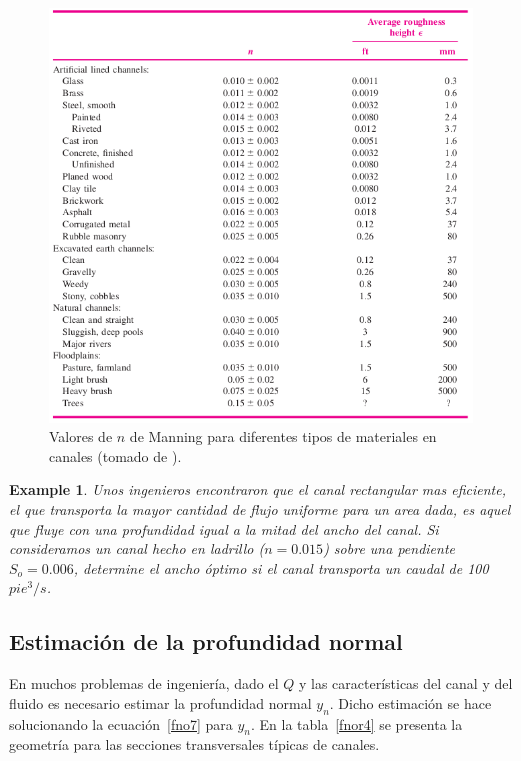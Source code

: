 \documentclass[11pt, oneside]{article}
\newtheorem{exa}{Example}
\begin{document}
\begin{figure}[h]
\centering
\includegraphics[width=\textwidth]{fnor3.png}
\caption{Valores de $n$ de Manning para diferentes tipos de materiales en canales (tomado de \cite{white1990fluid}).}
\label{fnor3}
\end{figure}

\begin{shaded}
\begin{exa}
Unos ingenieros encontraron que el canal rectangular mas eficiente, el que transporta la mayor cantidad de flujo uniforme para un area dada, es aquel que fluye con una profundidad igual a la mitad del ancho del canal. Si consideramos un canal hecho en ladrillo ($n=0.015$) sobre una pendiente $S_o = 0.006$, determine el ancho \'optimo si el canal transporta un caudal de 100 $pie^3 /s$.
\end{exa}
\end{shaded}




\subsection{Estimaci\'on de la profundidad normal}
En muchos problemas de ingenier\'ia, dado el $Q$ y las caracter\'isticas del canal y del fluido es necesario estimar la profundidad normal $y_n$. Dicho estimaci\'on se hace solucionando la ecuaci\'on~\ref{fno7} para $y_n$. En la tabla~\ref{fnor4} se presenta la geometr\'ia para las secciones transversales t\'ipicas de canales.
\end{document}
